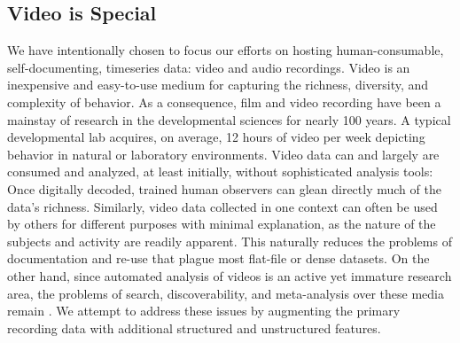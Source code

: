 \documentclass{sig-alternate}
\begin{document}
\subsection{Video is Special}
We have intentionally chosen to focus our efforts on hosting human-consumable, self-documenting, timeseries data: video and audio recordings.
Video is an inexpensive and easy-to-use medium for capturing the richness, diversity, and complexity of behavior.
As a consequence, film and video recording have been a mainstay of research in the developmental sciences for nearly 100 years. 
A typical developmental lab acquires, on average, 12 hours of video per week depicting behavior in natural or laboratory environments.
Video data can and largely are consumed and analyzed, at least initially, without sophisticated analysis tools: Once digitally decoded, trained human observers can glean directly much of the data's richness.
Similarly, video data collected in one context can often be used by others for different purposes with minimal explanation, as the nature of the subjects and activity are readily apparent.
This naturally reduces the problems of documentation and re-use that plague most flat-file or dense datasets.
On the other hand, since automated analysis of videos is an active yet immature research area, the problems of search, discoverability, and meta-analysis over these media remain \cite{Albertson_2013}.
We attempt to address these issues by augmenting the primary recording data with additional structured and unstructured features.
\end{document}
